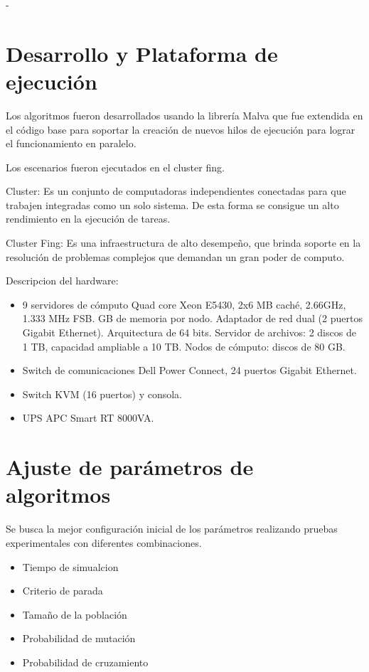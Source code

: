 -




\section{Desarrollo y Plataforma de ejecución }
Los algoritmos fueron desarrollados usando la librería Malva que fue extendida en el código base para soportar la creación de nuevos hilos de ejecución para lograr el funcionamiento en paralelo.


Los escenarios fueron ejecutados en el cluster fing.

Cluster: Es un conjunto de computadoras independientes conectadas para que trabajen integradas como un solo sistema. De esta forma se consigue un alto rendimiento en la ejecución de tareas. 

Cluster Fing: Es una infraestructura de alto desempeño, que brinda soporte en la resolución de problemas complejos que demandan un gran poder de computo.

Descripcion del hardware: 
\begin{itemize}
	\item 9 servidores de cómputo
	\subitem Quad core Xeon E5430, 2x6 MB caché, 2.66GHz, 1.333 MHz FSB.
	 GB de memoria por nodo.
	\subitem Adaptador de red dual (2 puertos Gigabit Ethernet).
	\subitem  Arquitectura de 64 bits.
	\subitem Servidor de archivos: 2 discos de 1 TB, capacidad ampliable a 10 TB.
	\subitem Nodos de cómputo: discos de 80 GB.
	\item Switch de comunicaciones
	\subitem Dell Power Connect, 24 puertos Gigabit Ethernet.
	\item Switch KVM (16 puertos) y consola.
	\item UPS APC Smart RT 8000VA.
\end{itemize}

\section{Ajuste de parámetros de algoritmos}
Se busca la mejor configuración inicial de los parámetros realizando pruebas experimentales con diferentes combinaciones.  

\begin{itemize}
	\item Tiempo de simualcion	
	\item Criterio de parada
	\item Tamaño de la población
	\item Probabilidad de mutación
	\item Probabilidad de cruzamiento
\end{itemize}

